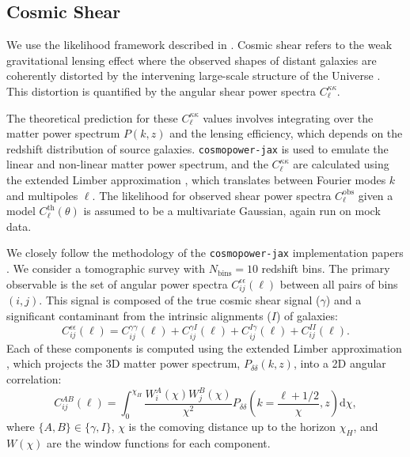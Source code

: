 \documentclass[twocolumn]{openjournal}
\begin{document}
\subsection{Cosmic Shear}
We use the likelihood framework described in \citep{Piras_2023,Piras_2024}. Cosmic shear refers to the weak gravitational lensing effect where the observed shapes of distant galaxies are coherently distorted by the intervening large-scale structure of the Universe \citep{Kilbinger_2015}. This distortion is quantified by the angular shear power spectra $C_\ell^{\kappa\kappa}$.

The theoretical prediction for these $C_\ell^{\kappa\kappa}$ values involves integrating over the matter power spectrum $P(k,z)$ and the lensing efficiency, which depends on the redshift distribution of source galaxies. \texttt{cosmopower-jax} is used to emulate the linear and non-linear matter power spectrum, and the $C_\ell^{\kappa\kappa}$ are calculated using the extended Limber approximation \citep{LoVerde_2008}, which translates between Fourier modes $k$ and multipoles $\ell$. The likelihood for observed shear power spectra $C_\ell^{\text{obs}}$ given a model $C_\ell^{\text{th}}(\theta)$ is assumed to be a multivariate Gaussian, again run on mock data.

We closely follow the methodology of the \texttt{cosmopower-jax} implementation papers \citep{Piras_2023}. We consider a tomographic survey with $N_{\text{bins}}=10$ redshift bins. The primary observable is the set of angular power spectra $C^{\epsilon \epsilon}_{i j} (\ell)$ between all pairs of bins $(i,j)$. This signal is composed of the true cosmic shear signal ($\gamma$) and a significant contaminant from the intrinsic alignments ($I$) of galaxies:
\begin{equation}
	C^{\epsilon \epsilon}_{i j} (\ell) = C^{\gamma \gamma}_{i j} (\ell) + C^{\gamma I}_{i j} (\ell) + C^{I \gamma}_{i j} (\ell) + C^{I I}_{i j} (\ell).
\end{equation}
Each of these components is computed using the extended Limber approximation \citep{LoVerde_2008}, which projects the 3D matter power spectrum, $P_{\delta \delta}(k,z)$, into a 2D angular correlation:
\begin{equation}
	C^{A B}_{i j} (\ell) = \int_0^{\chi_H} \frac{W_i^A (\chi)  W_j^B (\chi)}{\chi^2}  P_{\delta \delta} \left(k = \frac{\ell + 1/2}{\chi}, z \right) \mathrm{d}\chi,
\end{equation}
where $\{A, B\} \in \{\gamma, I \}$, $\chi$ is the comoving distance up to the horizon $\chi_H$, and $W(\chi)$ are the window functions for each component.
\end{document}
